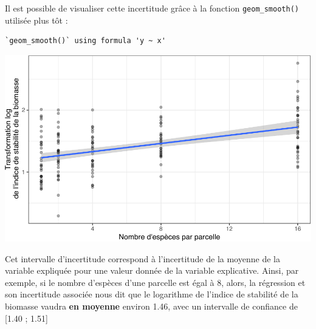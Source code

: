 \documentclass[
  a4paper,
]{article}
\newenvironment{Shaded}{\begin{snugshade}}{\end{snugshade}}
\newcommand{\CharTok}[1]{\textcolor[rgb]{0.57,0.30,0.62}{#1}}
\newcommand{\DataTypeTok}[1]{\textcolor[rgb]{0.00,0.34,0.68}{#1}}
\newcommand{\FloatTok}[1]{\textcolor[rgb]{0.69,0.50,0.00}{#1}}
\newcommand{\KeywordTok}[1]{\textcolor[rgb]{0.12,0.11,0.11}{\textbf{#1}}}
\newcommand{\NormalTok}[1]{\textcolor[rgb]{0.12,0.11,0.11}{#1}}
\newcommand{\OperatorTok}[1]{\textcolor[rgb]{0.12,0.11,0.11}{#1}}
\newcommand{\OtherTok}[1]{\textcolor[rgb]{0.00,0.43,0.16}{#1}}
\newcommand{\StringTok}[1]{\textcolor[rgb]{0.75,0.01,0.01}{#1}}
\begin{document}
Il est possible de visualiser cette incertitude grâce à la fonction \texttt{geom\_smooth()} utilisée plus tôt :

\begin{Shaded}
\end{Shaded}

\begin{verbatim}
`geom_smooth()` using formula 'y ~ x'
\end{verbatim}

\begin{center}\includegraphics[width=0.9\linewidth]{figure/unnamed-chunk-122-1} \end{center}

Cet intervalle d'incertitude correspond à l'incertitude de la moyenne de la variable expliquée pour une valeur donnée de la variable explicative. Ainsi, par exemple, si le nombre d'espèces d'une parcelle est égal à 8, alors, la régression et son incertitude associée nous dit que le logarithme de l'indice de stabilité de la biomasse vaudra \textbf{en moyenne} environ 1.46, avec un intervalle de confiance de {[}1.40 ; 1.51{]}
\end{document}
